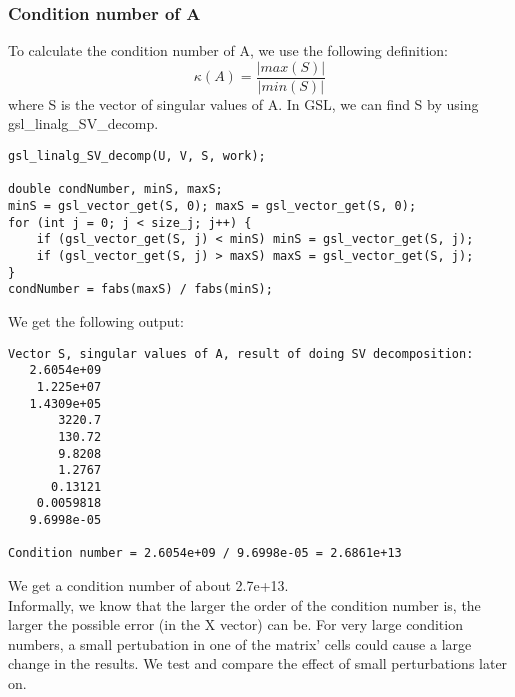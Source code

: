     \subsubsection{Condition number of A}
    To calculate the condition number of A, we use the following definition: \[\kappa(A)= \frac{|max(S)|}{|min(S)|} \]
    where S is the vector of singular values of A. In GSL, we can find S by using gsl\_linalg\_SV\_decomp.
\begin{lstlisting}
gsl_linalg_SV_decomp(U, V, S, work);

double condNumber, minS, maxS;
minS = gsl_vector_get(S, 0); maxS = gsl_vector_get(S, 0);
for (int j = 0; j < size_j; j++) {
    if (gsl_vector_get(S, j) < minS) minS = gsl_vector_get(S, j);
    if (gsl_vector_get(S, j) > maxS) maxS = gsl_vector_get(S, j);
}
condNumber = fabs(maxS) / fabs(minS);
\end{lstlisting}
    We get the following output:
\begin{lstlisting}
Vector S, singular values of A, result of doing SV decomposition:
   2.6054e+09
    1.225e+07
   1.4309e+05
       3220.7
       130.72
       9.8208
       1.2767
      0.13121
    0.0059818
   9.6998e-05

Condition number = 2.6054e+09 / 9.6998e-05 = 2.6861e+13
\end{lstlisting}
    We get a condition number of about 2.7e+13. \\
    Informally, we know that the larger the order of the condition number is, the larger the possible error (in the X vector) can be.
    For very large condition numbers, a small pertubation in one of the matrix' cells could cause a large change in the results.
    We test and compare the effect of small perturbations later on.

